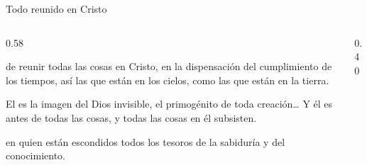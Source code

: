 \begin{frame}{Todo reunido en Cristo}
\begin{columns}[c,onlytextwidth]
\begin{column}{0.58\textwidth}
\begin{cita}de reunir todas las cosas en Cristo, en la dispensación del cumplimiento de los tiempos, así las que están en los cielos, como las que están en la tierra.\end{cita}
\begin{cita}El es la imagen del Dios invisible, el primogénito de toda creación\ldots{} Y él es antes de todas las cosas, y todas las cosas en él subsisten.\end{cita}
\begin{cita}en quien están escondidos todos los tesoros de la sabiduría y del conocimiento.\end{cita}
\end{column}
\begin{column}{0.40\textwidth}\end{column}
\end{columns}
\end{frame}

